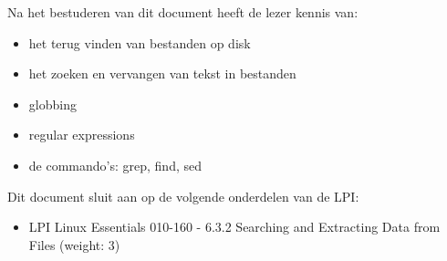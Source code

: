 Na het bestuderen van dit document heeft de lezer kennis van:
\begin{itemize}
\item het terug vinden van bestanden op disk
\item het zoeken en vervangen van tekst in bestanden
\item globbing
\item regular expressions
\item de commando's: grep, find, sed
\end{itemize}

Dit document sluit aan op de volgende onderdelen van de LPI:
\begin{itemize}
\item LPI Linux Essentials 010-160 - 6.3.2 Searching and Extracting Data from Files (weight: 3)
\end{itemize}


